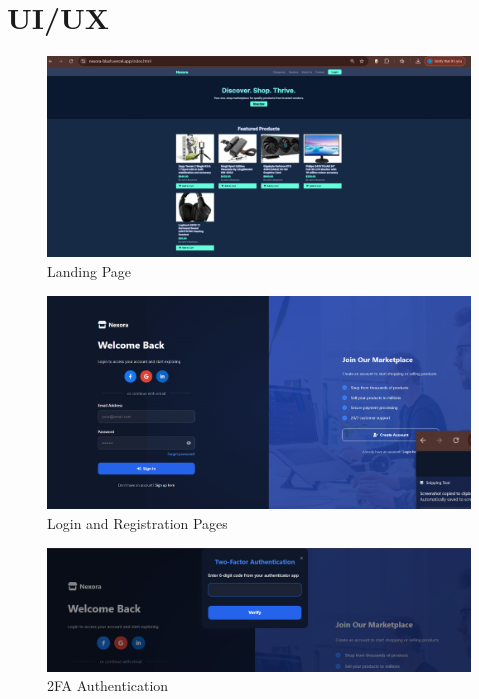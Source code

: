 \section{UI/UX}

\begin{figure}[htbp]
\centering
\includegraphics[width=\textwidth,keepaspectratio]{thesis/figures/Landing-Page.png}
\caption{Landing Page}
\label{fig:landing-page}
\end{figure}

\begin{figure}[htbp]
\centering
\includegraphics[width=\textwidth,keepaspectratio]{thesis/figures/Login-Registration.png}
\caption{Login and Registration Pages}
\label{fig:login-register}
\end{figure}

\begin{figure}[htbp]
\centering
\includegraphics[width=\textwidth,keepaspectratio]{thesis/figures/2Fa.png}
\caption{2FA Authentication}
\label{fig:2fa}
\end{figure}

